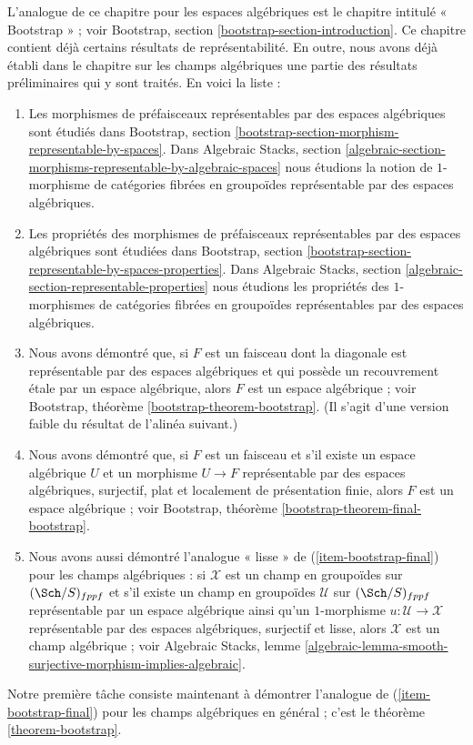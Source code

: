 \noindent
L'analogue de ce chapitre pour les espaces algébriques est le chapitre intitulé
« Bootstrap » ; voir
Bootstrap, section \ref{bootstrap-section-introduction}.
Ce chapitre contient déjà certains résultats de représentabilité.
En outre, nous avons déjà établi dans le chapitre sur les champs algébriques
une partie des résultats préliminaires qui y sont traités.
En voici la liste :
\begin{enumerate}
\item Les morphismes de préfaisceaux représentables par des espaces algébriques sont étudiés dans
Bootstrap, section
\ref{bootstrap-section-morphism-representable-by-spaces}.
Dans
Algebraic Stacks, section
\ref{algebraic-section-morphisms-representable-by-algebraic-spaces}
nous étudions la notion de $1$-morphisme de catégories fibrées en groupoïdes
représentable par des espaces algébriques.
\item Les propriétés des morphismes de préfaisceaux représentables par des
espaces algébriques sont étudiées dans
Bootstrap, section
\ref{bootstrap-section-representable-by-spaces-properties}.
Dans
Algebraic Stacks, section
\ref{algebraic-section-representable-properties}
nous étudions les propriétés des $1$-morphismes de catégories fibrées en groupoïdes
représentables par des espaces algébriques.
\item Nous avons démontré que, si $F$ est un faisceau dont la diagonale est représentable
par des espaces algébriques et qui possède un recouvrement \'etale par un espace
algébrique, alors $F$ est un espace algébrique ; voir
Bootstrap, théorème \ref{bootstrap-theorem-bootstrap}.
(Il s'agit d'une version faible du résultat de l'alinéa suivant.)
\item
\label{item-bootstrap-final}
Nous avons démontré que, si $F$ est un faisceau et s'il existe un espace
algébrique $U$ et un morphisme $U \to F$ représentable par des espaces
algébriques, surjectif, plat et localement de présentation finie, alors
$F$ est un espace algébrique ; voir
Bootstrap, théorème \ref{bootstrap-theorem-final-bootstrap}.
\item Nous avons aussi démontré l'analogue « lisse » de
(\ref{item-bootstrap-final}) pour les champs
algébriques : si $\mathcal{X}$ est un champ en groupoïdes sur
$(\Sch/S)_{fppf}$ et s'il existe un champ en groupoïdes
$\mathcal{U}$ sur $(\Sch/S)_{fppf}$ représentable
par un espace algébrique ainsi qu'un $1$-morphisme $u : \mathcal{U} \to \mathcal{X}$
représentable par des espaces algébriques, surjectif et lisse,
alors $\mathcal{X}$ est un champ algébrique ; voir
Algebraic Stacks, lemme
\ref{algebraic-lemma-smooth-surjective-morphism-implies-algebraic}.
\end{enumerate}
Notre première tâche consiste maintenant à démontrer l'analogue de
(\ref{item-bootstrap-final}) pour les champs
algébriques en général ; c'est le
théorème \ref{theorem-bootstrap}.



